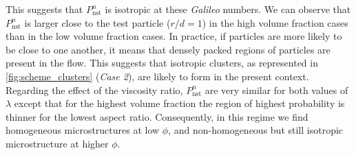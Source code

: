 This suggests that $P_\text{nst}^n$ is isotropic at these \textit{Galileo} numbers. We can observe that $P_\text{nst}^n$ is larger close to the test particle ($r/d = 1$) in the high volume fraction cases than in the low volume fraction cases.
In practice, if particles are more likely to be close to one another, it means that densely packed regions of particles are present in the flow.
This suggests that isotropic clusters, as represented in \ref{fig:scheme_clusters} (\textit{Case 2}), are likely to form in the present context. 
Regarding the effect of the viscosity ratio, $P_\text{nst}^n$ are very similar for both values of $\lambda$ except that for the highest volume fraction the region of highest probability is thinner for the lowest aspect ratio. 
Consequently, in this regime we find homogeneous microstructures at low $\phi$, and non-homogeneous but still isotropic microstructure at higher $\phi$. 

